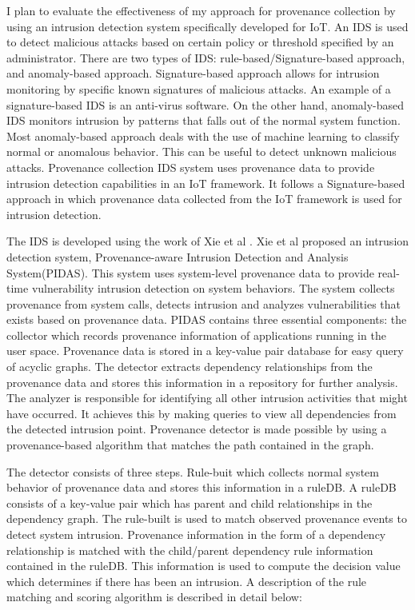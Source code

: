 I plan to evaluate the effectiveness of my approach for provenance collection by using an intrusion detection system specifically developed for IoT. An IDS is used to detect malicious attacks based on certain policy or threshold specified by an administrator. There are two types of  IDS: rule-based/Signature-based approach, and anomaly-based approach. Signature-based approach allows for intrusion monitoring by specific known signatures of malicious attacks. An example of a signature-based IDS is an anti-virus software. On the other hand, anomaly-based IDS monitors intrusion by patterns that falls out of the normal system function. Most anomaly-based approach deals with the use of machine learning to classify normal or anomalous behavior. This can be useful to detect unknown malicious attacks. Provenance collection IDS system uses provenance data to provide intrusion detection capabilities in an IoT framework. It follows a Signature-based approach in which provenance data collected from the IoT framework is used for intrusion detection. 
\par The IDS is developed using the work of Xie et al \cite{Xie:2016:UID:2936026.2936232}. Xie et al proposed an intrusion detection system, Provenance-aware Intrusion Detection and Analysis System(PIDAS). This system uses system-level provenance data to provide real-time vulnerability intrusion detection on system behaviors. The system collects provenance from system calls, detects intrusion and analyzes vulnerabilities that exists based on provenance data. PIDAS contains three essential components: the collector which records provenance information of applications running in the user space. Provenance data is stored in a key-value pair database for easy query of acyclic graphs. The detector extracts dependency relationships from the provenance data and stores this information in a repository for further analysis. The analyzer is responsible for identifying all other intrusion activities that might have occurred. It achieves this by making queries to view all dependencies from the detected intrusion point. Provenance detector is made possible by using a provenance-based algorithm that matches the path contained in the graph.


The detector consists of three steps. Rule-buit which collects normal system behavior of provenance data and stores this information in a ruleDB. A ruleDB consists of a key-value pair which has parent and child relationships in the dependency graph. The rule-built is used to match observed provenance events  to detect system intrusion. Provenance information in the form of a dependency relationship is matched with the child/parent dependency rule information contained in the ruleDB. This information is used to compute the decision value which determines if there has been an intrusion.  A description of the rule matching and scoring algorithm is described in detail below: 

